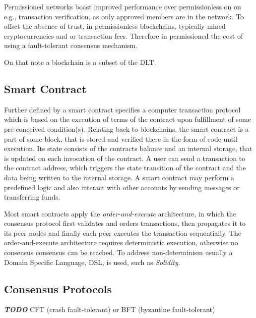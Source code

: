 Permissioned networks boast improved performance over permissionless on on e.g., transaction verification, as only
approved members are in the network. To offset the absence of trust, in permissionless blockchains, typically mined
cryptocurrencies and or transaction fees. Therefore in permissioned the cost of using a fault-tolerant consensus
mechanism.

On that note a blockchain is a subset of the DLT. \cite{diam-iot-2020}

\subsection{Smart Contract} %
\label{sec:Smart Contract}
Further defined by \cite{diam-iot-2020} a smart contract specifies a computer transaction protocol which is based on the
execution of terms of the contract upon fulfillment of some pre-conceived condition(s).
Relating back to blockchains, the smart contract is a part of some block, that is stored and verified there in the form
of code until execution. Its state consists of the contracts balance and an internal storage, that is updated on each
invocation of the contract. A user can send a transaction to the contract address, which triggers the state transition
of the contract and the data being written to the internal storage. A smart contract may perform a predefined logic and
also interact with other accounts by sending messages or transferring funds.

Most smart contracts apply the \textit{order-and-execute} architecture, in which the consensus protocol first validates
and orders transactions, then propagates it to its peer nodes and finally each peer executes the transaction
sequentially. The order-and-execute architecture requires deterministic execution, otherwise no consensus consensus can
be reached. To address non-determinism usually a Domain Specific Language, DSL, is used, such as \textit{Solidity}.

\subsection{Consensus Protocols} %
\label{sub:Consensus Protocols}
\textbf{\textit{TODO}}
CFT (crash fault-tolerant) or BFT (byzantine fault-tolerant)

